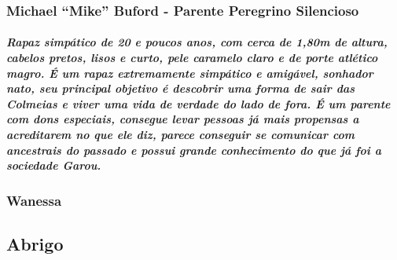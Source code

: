\subsubsection{\bf Michael “Mike” Buford - Parente Peregrino Silencioso}
\subparagraph*{Rapaz simpático de 20 e poucos anos, com cerca de 1,80m de altura, cabelos pretos, lisos e curto, pele caramelo claro e de porte atlético magro. É um rapaz extremamente simpático e amigável, sonhador nato, seu principal objetivo é descobrir uma forma de sair das Colmeias e viver uma vida de verdade do lado de fora. É um parente com dons especiais, consegue levar pessoas já mais propensas a acreditarem no que ele diz, parece conseguir se comunicar com ancestrais do passado e possui grande conhecimento do que já foi a sociedade Garou.}
\preencher

\subsubsection{\bf Wanessa} 
\subparagraph*{}
\preencher


\subsection{\bf Abrigo}
